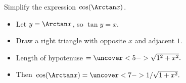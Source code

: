 \begin{frame}
\begin{example} %
Simplify the expression $\cos (\Arctan x)$.
\begin{itemize}
\item<2->  Let $y = \Arctan x$, so $\tan y = x$.
\item<3->  Draw a right triangle with opposite $x$ and adjacent $1$.
\item<4->  \alert<handout:0| 4-5>{Length of hypotenuse $ = \uncover<5->{\sqrt{1^2+x^2}.}$}
\item<6->  Then \alert<handout:0| 6-7>{$\cos (\Arctan x) = \uncover<7->{1/\sqrt{1+x^2}.}$}
\end{itemize}
\ %
%
%
\end{example}
\end{frame}
